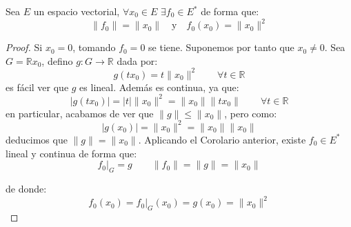 \begin{coro}\label{coro:existencia_f0}
    Sea $E$ un espacio vectorial, $\forall x_0\in E$ $\exists f_0\in E^\ast$ de forma que:
    \begin{equation*}
        \|f_0\| = \|x_0\| \quad \text{y} \quad  f_0(x_0)= \|x_0\|^2
    \end{equation*}
    \begin{proof}
        Si $x_0 = 0$, tomando $f_0 = 0$ se tiene. Suponemos por tanto que $x_0\neq 0$. Sea $G = \mathbb{R} x_0$, defino $g:G\to \mathbb{R}$ dada por:
            \begin{equation*}
                g(tx_0) = t\|x_0\|^2 \qquad \forall t\in \mathbb{R}
            \end{equation*}
            es fácil ver que $g$ es lineal. Además es continua, ya que:
            \begin{equation*}
                |g(tx_0)| = |t|\|x_0\|^2 = \|x_0\|\|tx_0\| \qquad \forall t\in \mathbb{R}
            \end{equation*}
            en particular, acabamos de ver que $\|g\| \leq \|x_0\|$, pero como:
            \begin{equation*}
                |g(x_0)| = \|x_0\|^2 = \|x_0\|\|x_0\|
            \end{equation*}
            deducimos que $\|g\| = \|x_0\|$. Aplicando el Corolario anterior, existe $f_0\in E^\ast$ lineal y continua de forma que:
            \begin{equation*}
                f_0\big|_G  = g \qquad \|f_0\| = \|g\| = \|x_0\|
            \end{equation*}

            de donde:
            \begin{equation*}
                f_0(x_0) = f_0\big|_G(x_0) = g(x_0) = \|x_0\|^2 
            \end{equation*}
    \end{proof}
\end{coro}

